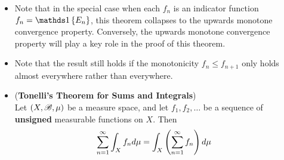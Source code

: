 \documentclass[11pt]{article}
\begin{document}
\begin{itemize}
\begin{proof}
Let $0 < \epsilon < 1$ be arbitrary. Then we have $f(x) = \sup_{n}\set{f_n(x)} > (1 - \epsilon)c_{i}$ for all $x \in  E_{i}$. Thus, if we define the sets
\begin{align*}
E_{i,n}&= \set{x\in E_{i}:  f_{n}(x)>  (1 - \epsilon)c_{i} }
\end{align*} then the $E_{i,n}$ increase to $E_i$ and are measurable. By upwards monotonicity of measure, we conclude that
\begin{align*}
\lim\limits_{n\rightarrow \infty}\mu(E_{i,n}) &= \mu(E_{i}), \; 1\le i\le m.
\end{align*}
On the other hand, observe the pointwise bound
\begin{align*}
f_{n}(x) &\ge   (1 - \epsilon)\sum_{i=1}^{m}c_{i}\ind{E_{i,n}}
\end{align*} hold for any $n$. Integrate both sides, 
\begin{align*}
\int_{X}f_{n} d\mu &\ge (1 - \epsilon)\sum_{i=1}^{m}c_{i}\mu\paren{E_{i,n}}.
\end{align*} and take the limits $n\rightarrow \infty$,
\begin{align*}
\lim\limits_{n\rightarrow \infty}\int_{X}f_{n} d\mu  &\ge  (1 - \epsilon)\sum_{i=1}^{m}c_{i}\lim\limits_{n\rightarrow \infty}\mu\paren{E_{i,n}}\\
&= (1 - \epsilon)\sum_{i=1}^{m}c_{i}\mu(E_{i}).
\end{align*} Finally, send $\epsilon \rightarrow 0$, we have the required formula. \qed
\end{proof}

\item \begin{remark}
Note that in the special case when each $f_n$ is an indicator function $f_n = \ind{E_n}$, this theorem collapses to the upwards monotone convergence property. Conversely, the upwards monotone convergence property will play a key role in the proof of this theorem.
\end{remark}

\item \begin{remark}
 Note that  the result still holds if the monotonicity $f_n \le f_{n+1}$ only holds almost everywhere rather than everywhere.
 \end{remark}
 
\item \begin{corollary}(\textbf{Tonelli's Theorem for Sums and Integrals})\\
Let $(X, {\mathscr B}, \mu)$ be a measure space, and let $f_1, f_2, \ldots $ be a sequence of \textbf{unsigned} measurable functions on $X$. Then 
\begin{align*}
\sum_{n=1}^{\infty}\int_{X}f_{n} d\mu &= \int_{X}\left(\sum_{n=1}^{\infty}f_{n}\right) d\mu 
\end{align*}
\end{corollary}


\end{itemize}
\end{document}
